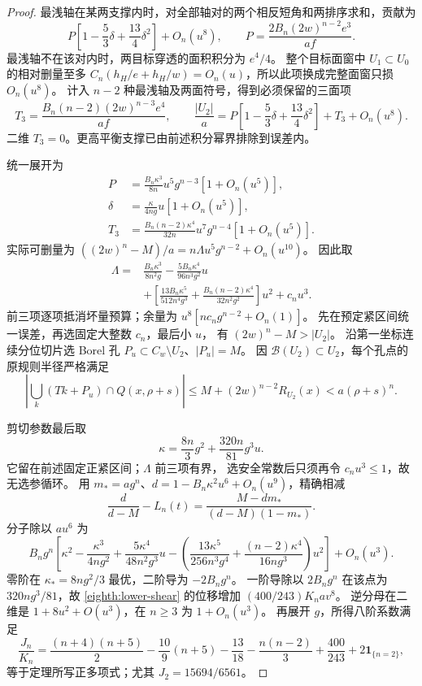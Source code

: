 \begin{proof}
最浅轴在某两支撑内时，对全部轴对的两个相反短角和两排序求和，贡献为
\[
 P\left[1-\frac53\delta+\frac{13}{4}\delta^2\right]+O_n(u^8),
 \qquad P=\frac{2B_n(2w)^{n-2}e^3}{af}.
\]
最浅轴不在该对内时，两目标穿透的面积积分为 \(e^4/4\)。
整个目标面窗中 \(U_1\subset U_0\) 的相对删量至多
\(C_n(h_H/e+h_H/w)=O_n(u)\)，所以此项换成完整面窗只损 \(O_n(u^8)\)。
计入 \(n-2\) 种最浅轴及两面符号，得到必须保留的三面项
\[
 T_3=\frac{B_n(n-2)(2w)^{n-3}e^4}{af},
 \qquad
 \frac{|U_2|}{a}
 =P\left[1-\frac53\delta+\frac{13}{4}\delta^2\right]+T_3+O_n(u^8).
\]
二维 \(T_3=0\)。更高平衡支撑已由前述积分幂界排除到误差内。

统一展开为
\[
 \begin{aligned}
 P&=\frac{B_n\kappa^3}{8n}u^5g^{n-3}[1+O_n(u^5)],\quad\\
 \delta&=\frac{\kappa}{4ng}u[1+O_n(u^5)],\quad\\
 T_3&=\frac{B_n(n-2)\kappa^4}{32n}u^7g^{n-4}[1+O_n(u^5)].
 \end{aligned}
\]
实际可删量为
\(((2w)^n-M)/a=n\Lambda u^5g^{n-2}+O_n(u^{10})\)。
因此取
\begin{equation}\label{eighth:lower-mass}
 \begin{aligned}
 \Lambda={}&\frac{B_n\kappa^3}{8n^2g}
 -\frac{5B_n\kappa^4}{96n^3g^2}u\\
 &+\left[\frac{13B_n\kappa^5}{512n^4g^3}
        +\frac{B_n(n-2)\kappa^4}{32n^2g^2}\right]u^2+c_nu^3.
 \end{aligned}
\end{equation}
前三项逐项抵消坏量预算；余量为
\(u^8[nc_ng^{n-2}+O_n(1)]\)。
先在预定紧区间统一误差，再选固定大整数 \(c_n\)，最后小 \(u\)，
有 \((2w)^n-M>|U_2|\)。
沿第一坐标连续分位切片选 Borel 孔
\(P_u\subset C_w\setminus U_2\)、\(|P_u|=M\)。
因 \(\mathcal B(U_2)\subset U_2\)，每个孔点的原规则半径严格满足
\[
 \left|\bigcup_k(Tk+P_u)\cap Q(x,\rho+s)\right|
 \le M+(2w)^{n-2}R_{U_2}(x)<a(\rho+s)^n.
\]

剪切参数最后取
\begin{equation}\label{eighth:lower-shear}
 \kappa=\frac{8n}{3}g^2+\frac{320n}{81}g^3u .
\end{equation}
它留在前述固定正紧区间；\(\Lambda\) 前三项有界，
选安全常数后只须再令 \(c_nu^3\le1\)，故无选参循环。
用 \(m_*=ag^n\)、\(d=1-B_n\kappa^2u^6+O_n(u^9)\)，精确相减
\[
 \frac d{d-M}-L_n(t)=\frac{M-dm_*}{(d-M)(1-m_*)}.
\]
分子除以 \(au^6\) 为
\[
 B_ng^n\left[
 \kappa^2-\frac{\kappa^3}{4ng^2}
 +\frac{5\kappa^4}{48n^2g^3}u
 -\left(\frac{13\kappa^5}{256n^3g^4}
       +\frac{(n-2)\kappa^4}{16ng^3}\right)u^2\right]+O_n(u^3).
\]
零阶在 \(\kappa_*=8ng^2/3\) 最优，二阶导为 \(-2B_ng^n\)。
一阶导除以 \(2B_ng^n\) 在该点为 \(320ng^3/81\)，故
\eqref{eighth:lower-shear} 的位移增加 \((400/243)K_nav^8\)。
逆分母在二维是 \(1+8u^2+O(u^3)\)，在 \(n\ge3\) 为 \(1+O_n(u^3)\)。
再展开 \(g\)，所得八阶系数满足
\[
 \frac{J_n}{K_n}
 =\frac{(n+4)(n+5)}2-\frac{10}{9}(n+5)-\frac{13}{18}
       -\frac{n(n-2)}3+\frac{400}{243}+2\mathbf1_{\{n=2\}},
\]
等于定理所写正多项式；尤其 \(J_2=15694/6561\)。


\end{proof}
